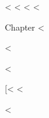 \documentclass[12pt]{article}
\begin{document}
\begin{flushleft}
<%
<%
<%
<%

\begin{center}
Chapter <%
\end{center}

<%
    \begin{description}
        <%
            \item[<%
        <%
    \end{description}
<%

\end{flushleft}
\end{document}
